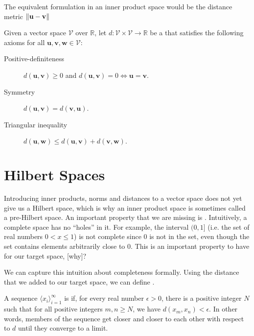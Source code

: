 The equivalent formulation in an inner product space would be the distance metric $\lVert\mathbf{u} - \mathbf{v}\rVert$

\begin{definition}[Distance]
Given a vector space $\mathcal{V}$ over $\mathbb{R}$, let $d : \mathcal{V} \times \mathcal{V} \to \mathbb{R}$ be a  that satisfies the following axioms for all $\mathbf{u}, \mathbf{v}, \mathbf{w} \in \mathcal{V}$:
%
\begin{description}
  \item[Positive-definiteness] $d(\mathbf{u}, \mathbf{v}) \geq 0$ and $d(\mathbf{u}, \mathbf{v}) = 0 \Leftrightarrow \mathbf{u} = \mathbf{v}$.
  \item[Symmetry] $d(\mathbf{u}, \mathbf{v}) = d(\mathbf{v}, \mathbf{u})$.
  \item[Triangular inequality] $d(\mathbf{u}, \mathbf{w}) \leq d(\mathbf{u}, \mathbf{v}) + d(\mathbf{v}, \mathbf{w})$.
\end{description}
\end{definition}

\section{Hilbert Spaces}
Introducing inner products, norms and distances to a vector space does not yet give us a Hilbert space, which is why an inner product space is sometimes called a pre-Hilbert space. An important property that we are missing is .  Intuitively, a complete space has no ``holes'' in it. For example, the interval $(0, 1]$ (i.e. the set of real numbers $0 < x \leq 1$) is not complete since $0$ is not in the set, even though the set contains elements arbitrarily close to $0$. This is an important property to have for our target space, [why]?

We can capture this intuition about completeness formally. Using the distance that we added to our target space, we can define .

\begin{definition}
A sequence $\langle x_i \rangle_{i=1}^\infty$ is  if, for every real number $\epsilon > 0$, there is a positive integer $N$ such that for all positive integers $m, n \geq N$, we have $d(x_m, x_n) < \epsilon$. In other words, members of the sequence get closer and closer to each other with respect to $d$ until they converge to a limit.
\end{definition}

